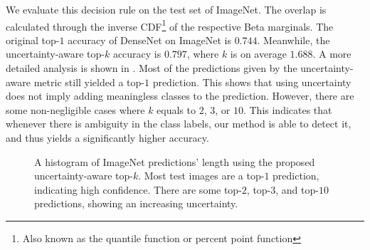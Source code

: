 We evaluate this decision rule on the test set of ImageNet. The overlap is calculated through the inverse CDF\footnote{Also known as the quantile function or percent point function} of the respective Beta marginals. The original top-$1$ accuracy of DenseNet on ImageNet is $0.744$. Meanwhile, the uncertainty-aware top-$k$ accuracy is $0.797$, where $k$ is on average $1.688$. A more detailed analysis is shown in . Most of the predictions given by the uncertainty-aware metric still yielded a top-$1$ prediction. %
This shows that using uncertainty does not imply adding meaningless classes to the prediction.
However, there are some non-negligible cases where $k$ equals to $2$, $3$, or $10$. This indicates that whenever there is ambiguity in the class labels, our method is able to detect it, and thus yields a significantly higher accuracy.


\setlength{\figwidth}{0.8\textwidth}
\setlength{\figheight}{0.3\textheight}

\begin{figure}[h!]
    \centering
    \scriptsize

    \hspace{-2em}
    

    \caption{A histogram of ImageNet predictions' length using the proposed uncertainty-aware top-$k$. Most test images are a top-$1$ prediction, indicating high confidence. There are some top-$2$, top-$3$, and top-$10$ predictions, showing an increasing uncertainty.}
    \label{fig:imagenet_counts}
\end{figure}


